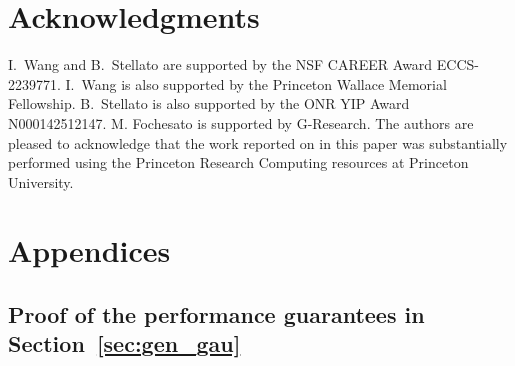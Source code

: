 \documentclass[12pt]{article}
\renewcommand{\paragraph}[1]{\textbf{#1.}\;}
\newcommand{\myack}{I.\ Wang and B.\ Stellato are supported by the NSF CAREER Award ECCS-2239771. I.\ Wang is also supported by the Princeton Wallace Memorial Fellowship. B.\ Stellato is also supported by the ONR YIP Award N000142512147. M. Fochesato is supported by G-Research. The authors are pleased to acknowledge that the work reported on in this paper was substantially performed using the Princeton Research Computing resources at Princeton University.
 }
\begin{document}
\section*{Acknowledgments}
\myack
\fi


\ifpreprint

\fi 

%



\appendix
\ifpreprint
\section{Appendices}
\fi

\ifpreprint
\subsection{Proof of the performance guarantees in Section~\ref{sec:gen_gau}}
\else
\end{document}
